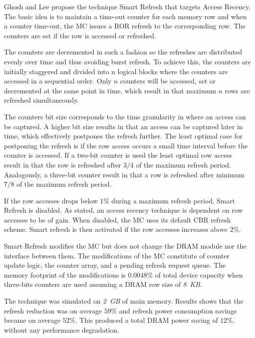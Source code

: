 Ghosh and Lee propose the technique Smart Refresh \cite{smartrefresh} that targets Access Recency. The basic idea is to maintain a time-out counter for each memory row and when a counter time-out, the MC issues a ROR refresh to the corresponding row. The counters are set if the row is accessed or refreshed.

The counters are decremented in such a fashion so the refreshes are distributed evenly over time and thus avoiding burst refresh. To achieve this, the counters are initially staggered and divided into n logical blocks where the counters are accessed in a sequential order. Only $n$ counters will be accessed, set or decremented at the same point in time, which result in that maximum $n$ rows are refreshed simultaneously. 

The counters bit size corresponds to the time granularity in where an access can be captured. A higher bit size results in that an access can be captured later in time, which effectively postpones the refresh further. The least optimal case for postponing the refresh is if the row access occurs a small time interval before the counter is accessed. If a two-bit counter is used the least optimal row access result in that the row is refreshed after $3/4$ of the maximum refresh period. Analogously, a three-bit counter result in that a row is refreshed after minimum $7/8$ of the maximum refresh period.

If the row accesses drops below $1\%$ during a maximum refresh period, Smart Refresh is disabled. As stated, an access recency technique is dependent on row accesses to be of gain. When disabled, the MC uses its default CBR refresh scheme. Smart refresh is then activated if the row accesses increases above $2\%$.

Smart Refresh modifies the MC but does not change the DRAM module nor the interface between them. The modifications of the MC constitute of counter update logic, the counter array, and a pending refresh request queue. The memory footprint of the modifications is $0.0048\%$ of total device capacity when three-bits counters are used assuming a DRAM row size of \textit{8~KB}.

The technique was simulated on \textit{2~GB} of main memory. Results shows that the refresh reduction was on average $59\%$ and refresh power consumption savings became on average $52\%$. This produced a total DRAM power saving of $12\%$, without any performance degradation.